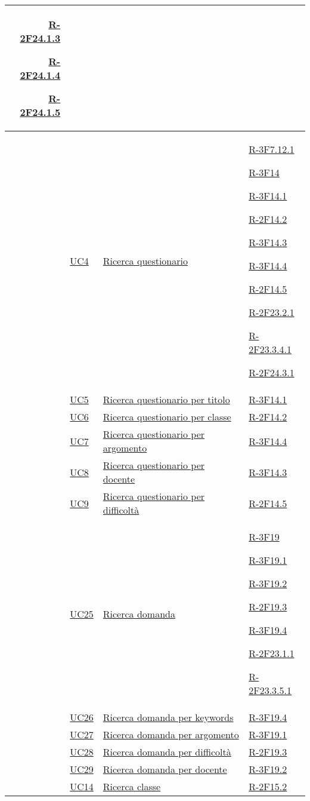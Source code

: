 \begin{longtable}{r l p{5cm} p{3cm}}
	\hyperlink{R-2F24.1.3}{R-2F24.1.3}
	
	\hyperlink{R-2F24.1.4}{R-2F24.1.4}
	
	\hyperlink{R-2F24.1.5}{R-2F24.1.5}\tabularnewline
	\hline
	& \hyperlink{UC4}{UC4} & \hyperlink{UC4}{Ricerca questionario} & \hyperlink{R-3F7.12.1}{R-3F7.12.1}
	
	\hyperlink{R-3F14}{R-3F14}
	
	\hyperlink{R-3F14.1}{R-3F14.1}
	
	\hyperlink{R-2F14.2}{R-2F14.2}
	
	\hyperlink{R-3F14.3}{R-3F14.3}
	
	\hyperlink{R-3F14.4}{R-3F14.4}
	
	\hyperlink{R-2F14.5}{R-2F14.5}
	
	\hyperlink{R-2F23.2.1}{R-2F23.2.1}
	
	\hyperlink{R-2F23.3.4.1}{R-2F23.3.4.1}
	
	\hyperlink{R-2F24.3.1}{R-2F24.3.1}\tabularnewline
	\hline
	& \hyperlink{UC5}{UC5} & \hyperlink{UC5}{Ricerca questionario per titolo} & \hyperlink{R-3F14.1}{R-3F14.1}\tabularnewline
	\hline
	& \hyperlink{UC6}{UC6} & \hyperlink{UC6}{Ricerca questionario per classe} & \hyperlink{R-2F14.2}{R-2F14.2}\tabularnewline
	\hline
	& \hyperlink{UC7}{UC7} & \hyperlink{UC7}{Ricerca questionario per argomento} & \hyperlink{R-3F14.4}{R-3F14.4}\tabularnewline
	\hline
	& \hyperlink{UC8}{UC8} & \hyperlink{UC8}{Ricerca questionario per docente} & \hyperlink{R-3F14.3}{R-3F14.3}\tabularnewline
	\hline
	& \hyperlink{UC9}{UC9} & \hyperlink{UC9}{Ricerca questionario per difficoltà} & \hyperlink{R-2F14.5}{R-2F14.5}\tabularnewline
	\hline
	& \hyperlink{UC25}{UC25} & \hyperlink{UC25}{Ricerca domanda} & \hyperlink{R-3F19}{R-3F19}
	
	\hyperlink{R-3F19.1}{R-3F19.1}
	
	\hyperlink{R-3F19.2}{R-3F19.2}
	
	\hyperlink{R-2F19.3}{R-2F19.3}
	
	\hyperlink{R-3F19.4}{R-3F19.4}
	
	\hyperlink{R-2F23.1.1}{R-2F23.1.1}
	
	\hyperlink{R-2F23.3.5.1}{R-2F23.3.5.1}\tabularnewline
	\hline
	& \hyperlink{UC26}{UC26} & \hyperlink{UC26}{Ricerca domanda per keywords} & \hyperlink{R-3F19.4}{R-3F19.4}\tabularnewline
	\hline
	& \hyperlink{UC27}{UC27} & \hyperlink{UC27}{Ricerca domanda per argomento} & \hyperlink{R-3F19.1}{R-3F19.1}\tabularnewline
	\hline
	& \hyperlink{UC28}{UC28} & \hyperlink{UC28}{Ricerca domanda per difficoltà} & \hyperlink{R-2F19.3}{R-2F19.3}\tabularnewline
	\hline
	& \hyperlink{UC29}{UC29} & \hyperlink{UC29}{Ricerca domanda per docente} & \hyperlink{R-3F19.2}{R-3F19.2}\tabularnewline
	\hline
	& \hyperlink{UC14}{UC14} & \hyperlink{UC14}{Ricerca classe} & \hyperlink{R-2F15.2}{R-2F15.2}
	

\end{longtable}
